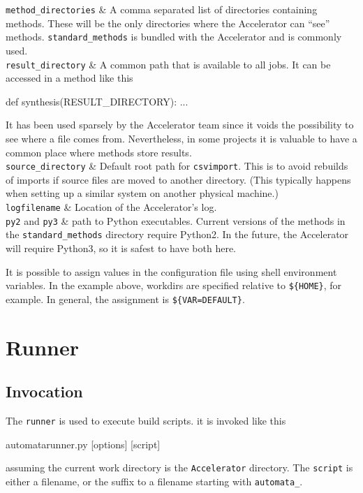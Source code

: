 \RPtwo \texttt{method\_directories} & A comma separated list of
directories containing methods.  These will be the only directories
where the Accelerator can ``see'' methods.  \texttt{standard\_methods}
is bundled with the Accelerator and is commonly used.\\[1ex]

\RPtwo \texttt{result\_directory} & A common path that is available to all
jobs.  It can be accessed in a method like this
\begin{python}
def synthesis(RESULT_DIRECTORY):
    ...
\end{python}
It has been used sparsely by the Accelerator team since it voids the
possibility to see where a file comes from.  Nevertheless, in some
projects it is valuable to have a common place where methods store
results.\\[1ex]

\RPtwo \texttt{source\_directory} & Default root path for
\texttt{csvimport}.  This is to avoid rebuilds of imports if source
files are moved to another directory.  (This typically happens when
setting up a similar system on another physical machine.)\\[1ex]

\RPtwo \texttt{logfilename} & Location of the Accelerator's log.\\[1ex]

\RPtwo \texttt{py2} and \texttt{py3} & path to Python executables.
Current versions of the methods in the \texttt{standard\_methods}
directory require Python2.  In the future, the Accelerator will
require Python3, so it is safest to have both here.

\stoptabletwo

It is possible to assign values in the configuration file using shell
environment variables.  In the example above, workdirs are specified
relative to \texttt{\$\{HOME\}}, for example.  In general, the
assignment is \texttt{\$\{VAR=DEFAULT\}}.



\clearpage
\section{Runner}

\subsection{Invocation}
The \texttt{runner} is used to execute build scripts.  it is invoked
like this
\begin{shell}
automatarunner.py [options] [script]
\end{shell}
assuming the current work directory is the \texttt{Accelerator}
directory.  The \texttt{script} is either a filename, or the suffix to
a filename starting with \texttt{automata\_}.


